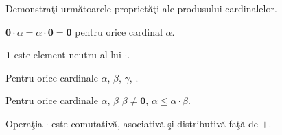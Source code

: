 \documentclass[12pt]{article}
\begin{document}
\semex
Demonstra\c ti urm\u atoarele propriet\u a\c ti ale produsului cardinalelor.
\be
\item $\mathbf{0}\cdot\alpha = \alpha\cdot\mathbf{0}=\mathbf{0}$ pentru orice cardinal $\alpha$.
\item\label{1-el-neutru-cdot} $\mathbf{1}$ este element neutru al lui $\cdot$.
\item \label{beta-leq-gamma-alpha-cdot} Pentru orice cardinale $\alpha$, $\beta$, $\gamma$,
\bua
\beta\leq \gamma {} \alpha\cdot\beta\leq \alpha\cdot\gamma. 
\eua 
\item\label{alpha-leq-alpha-beta} Pentru orice cardinale $\alpha$, $\beta$ \ai $\beta\ne\mathbf{0}$, $\alpha\leq \alpha\cdot \beta$.
\item Opera\c tia $\cdot$ este comutativ\u a, asociativ\u a \c si distributiv\u a fa\c t\u a de $+$.
\ee
\end{document}
